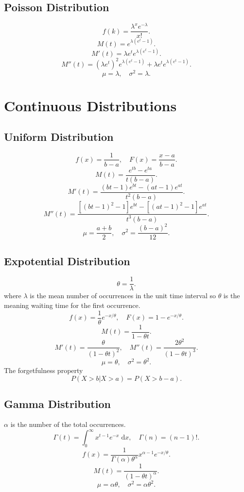 \documentclass[10pt,landscape,a4paper]{article}
\begin{document}
\begin{multicols*}{5}
        \subsection*{Poisson Distribution}
        \[
                f(k)=\frac{\lambda^x e^{-\lambda}}{x!}
        .\] 
        \[
                M(t)=e^{\lambda (e^t-1)}
        .\]
        \[
                M'(t)=\lambda e^t e^{\lambda(e^t-1)}
        .\] 
        \[
                M''(t)=(\lambda e^t)^2 e^{\lambda(e^t-1)}
                +\lambda e^t e^{\lambda(e^t-1)}
        .\]
        \[
                \mu = \lambda, \quad
                \sigma^2 = \lambda
        .\] 
        \section*{Continuous Distributions}
        \subsection*{Uniform Distribution}
        \[
                f(x)=\frac{1}{b-a}, \quad
                F(x)=\frac{x-a}{b-a}
        .\]
        \[
                M(t)=\frac{e^{tb}-e^{ta}}{t(b-a)}
        .\] 
        \[
                M'(t)=\frac{(bt-1)e^{bt}-(at-1)e^{at}}{t^2(b-a)}
        .\]
        \[
                M''(t)=\frac{[(bt-1)^2-1]e^{bt}-[(at-1)^2-1]e^{at}}{t^3(b-a)}
        .\] 
        \[
                \mu = \frac{a+b}{2}, \quad
                \sigma^2 = \frac{(b-a)^2}{12} 
        .\]
        \subsection*{Expotential Distribution}
        \[
                \theta = \frac{1}{\lambda}
        .\]
        where $\lambda$ is the mean number of occurrences in the unit time interval
        so $\theta$ is the meaning waiting time for the first occurrence.
        \[
                f(x)=\frac{1}{\theta}e^{-x / \theta}, \quad
                F(x)=1-e^{-x / \theta}
        .\]
        \[
                M(t)=\frac{1}{1-\theta t}
        .\] 
        \[
                M'(t)=\frac{\theta}{(1-\theta t)^2}, \quad 
                M''(t)=\frac{2 \theta^2}{(1-\theta t)^3}
        .\] 
        \[
                \mu = \theta, \quad
                \sigma^2 = \theta^2
        .\]
        The forgetfulness property
        \[
                P(X>b | X>a) = P(X>b-a)
        .\] 
        \subsection*{Gamma Distribution}
        $\alpha$ is the number of the total occurrences.
        \[
                \Gamma (t) = \int_0^\infty x^{t-1} e^{-x} \; \mathrm d x, \quad
                \Gamma (n) = (n-1)!
        .\] 
        \[
                f(x) = \frac{1}{\Gamma (\alpha) \theta^\alpha} 
                x^{\alpha-1} e^{-x / \theta}
        .\] 
        \[ 
                M(t)=\frac{1}{(1-\theta t)^\alpha}
        .\] 
        \[
                \mu = \alpha \theta, \quad
                \sigma^2 = \alpha \theta^2
        .\]

\end{multicols*}
\end{document}
